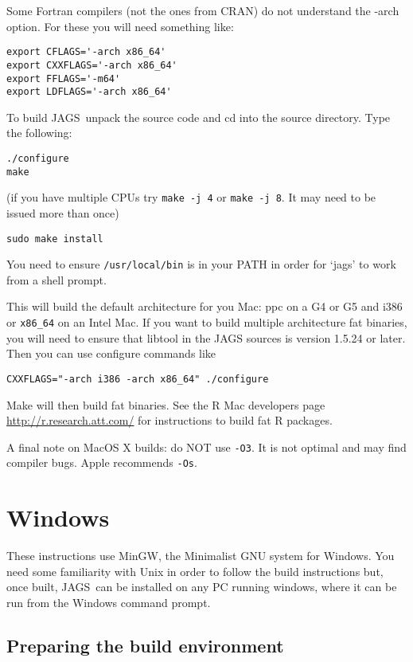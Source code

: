 \documentclass[11pt, a4paper, titlepage]{article}
\newcommand{\JAGS}{\textsf{JAGS}}
\begin{document}
Some Fortran compilers (not the ones from CRAN) do not understand 
the -arch option. For these you will need something like:
\begin{verbatim}
export CFLAGS='-arch x86_64'
export CXXFLAGS='-arch x86_64'
export FFLAGS='-m64'
export LDFLAGS='-arch x86_64'
\end{verbatim}

To build \JAGS\ unpack the source code and cd into the source  
directory. Type the following:
\begin{verbatim}
./configure
make
\end{verbatim}
(if you have multiple CPUs try \verb+make -j 4+ or
\verb+make -j 8+. It may need to be issued more than once)
\begin{verbatim}
sudo make install
\end{verbatim}

You need to ensure \texttt{/usr/local/bin} is in your PATH in order
for `jags' to work from a shell prompt.

This will build the default architecture for you Mac: ppc on a G4 or
G5 and i386 or \verb+x86_64+ on an Intel Mac.  If you want to build
multiple architecture fat binaries, you will need to ensure that
libtool in the JAGS sources is version 1.5.24 or later.  Then you can
use configure commands like
\begin{verbatim}
CXXFLAGS="-arch i386 -arch x86_64" ./configure
\end{verbatim}

Make will then build fat binaries.  See the R Mac developers page 
\url{http://r.research.att.com/} for instructions to build fat R packages.

A final note on MacOS X builds: do NOT use \texttt{-O3}.  It is not optimal 
and may find compiler bugs.  Apple recommends \texttt{-Os}.

\clearpage
\section{Windows}
\label{section:windows}

These instructions use MinGW, the Minimalist GNU system for Windows.
You need some familiarity with Unix in order to follow the build
instructions but, once built, \JAGS\ can be installed on any PC
running windows, where it can be run from the Windows command prompt.

\subsection{Preparing the build environment}
\end{document}
